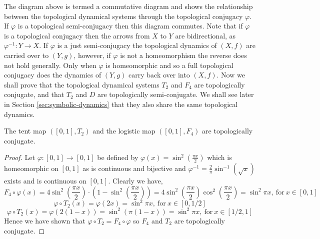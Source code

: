 \begin{center}
\end{center}

The diagram above is termed a commutative diagram and shows the relationship between the topological dynamical systems through the topological conjugacy $\varphi$. If $\varphi$ is a topological semi-conjugacy then this diagram commutes. Note that if $\varphi$ is a topological conjugacy then the arrows from $X$ to $Y$ are bidirectional, as $\varphi^{-1}: Y \to X$. If $\varphi$ is a just semi-conjugacy the topological dynamics of $(X, f)$ are carried over to $(Y, g)$, however, if $\varphi$ is not a homeomorphism the reverse does not hold generally. Only when $\varphi$ is homeomorphic and so a full topological conjugacy does the dynamics of $(Y, g)$ carry back over into $(X, f)$. Now we shall prove that the topological dynamical systems $T_2$ and $F_4$ are topologically conjugate, and that $T_2$ and $D$ are topologically semi-conjugate. We shall see later in Section \ref{sec:symbolic-dynamics} that they also share the same topological dynamics.

\begin{prop} \label{prop:tent-logistic-conjugate}
    The tent map $([0, 1], T_2)$ and the logistic map $([0, 1], F_4)$ are topologically conjugate.
    \begin{proof}
        Let $\varphi: [0, 1] \to [0,1]$ be defined by $\varphi(x) = \sin^2(\frac{\pi x}{2})$ which is homeomorphic on $[0, 1]$ as is continuous and bijective and $\varphi^{-1} = \frac{2}{\pi} \sin^{-1}(\sqrt{x})$ exists and is continuous on $[0, 1]$. Clearly we have, \[F_4 \circ \varphi(x) = 4 \sin^2\left(\frac{\pi x}{2}\right) \cdot \left(1 - \sin^2\left(\frac{\pi x}{2}\right)\right) = 4 \sin^2\left(\frac{\pi x}{2}\right) \cos^2\left(\frac{\pi x}{2}\right) = \sin^2\pi x, \ \text{for} \ x \in [0, 1]\] \[\varphi \circ T_2(x) = \varphi(2x) = \sin^2\pi x, \ \text{for} \ x \in \left[0, 1/2\right]\] \[\varphi \circ T_2(x) = \varphi(2(1 - x)) = \sin^2 (\pi (1-x)) = \sin^2 \pi x, \ \text{for} \ x \in [1/2, 1]\] Hence we have shown that $\varphi \circ T_2 = F_4 \circ \varphi$ so $F_4$ and $T_2$ are topologically conjugate.
    \end{proof}
\end{prop}


